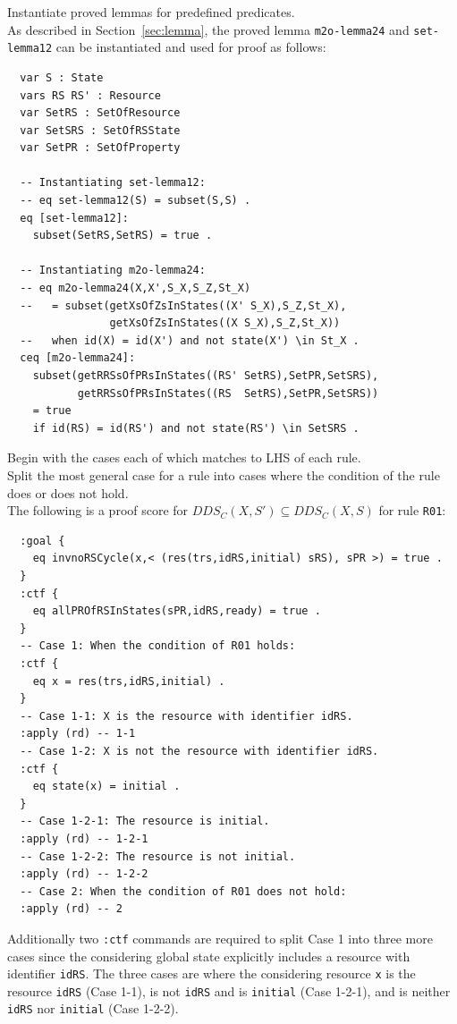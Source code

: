 \documentclass[12pt]{report}
\begin{document}
\vspace{0.3cm}
 Instantiate proved lemmas for predefined
predicates. \\ As described in Section~\ref{sec:lemma}, the proved
lemma {\tt m2o-lemma24} and {\tt set-lemma12} can be instantiated and
used for proof as follows:
\begin{verbatim}
  var S : State
  vars RS RS' : Resource
  var SetRS : SetOfResource
  var SetSRS : SetOfRSState
  var SetPR : SetOfProperty

  -- Instantiating set-lemma12:
  -- eq set-lemma12(S) = subset(S,S) .
  eq [set-lemma12]:
    subset(SetRS,SetRS) = true .

  -- Instantiating m2o-lemma24:
  -- eq m2o-lemma24(X,X',S_X,S_Z,St_X)
  --   = subset(getXsOfZsInStates((X' S_X),S_Z,St_X),
                getXsOfZsInStates((X S_X),S_Z,St_X))
  --   when id(X) = id(X') and not state(X') \in St_X .
  ceq [m2o-lemma24]:
    subset(getRRSsOfPRsInStates((RS' SetRS),SetPR,SetSRS),
           getRRSsOfPRsInStates((RS  SetRS),SetPR,SetSRS))
    = true
    if id(RS) = id(RS') and not state(RS') \in SetSRS .
\end{verbatim}

\vspace{0.3cm}
 Begin with the cases each of which matches to
LHS of each rule. \\ 
 Split the most general case for a rule into
cases where the condition of the rule does or does not hold. \\

\vspace{0.3cm}
The following is a proof score for $DDS_C(X,S')\subseteq DDS_C(X,S)$ for
rule {\tt R01}:
\begin{verbatim}
  :goal {
    eq invnoRSCycle(x,< (res(trs,idRS,initial) sRS), sPR >) = true .
  }
  :ctf {
    eq allPROfRSInStates(sPR,idRS,ready) = true .
  }
  -- Case 1: When the condition of R01 holds:
  :ctf {
    eq x = res(trs,idRS,initial) .
  }
  -- Case 1-1: X is the resource with identifier idRS.
  :apply (rd) -- 1-1
  -- Case 1-2: X is not the resource with identifier idRS.
  :ctf {
    eq state(x) = initial .
  }
  -- Case 1-2-1: The resource is initial.
  :apply (rd) -- 1-2-1
  -- Case 1-2-2: The resource is not initial.
  :apply (rd) -- 1-2-2
  -- Case 2: When the condition of R01 does not hold:
  :apply (rd) -- 2
\end{verbatim}
Additionally two {\tt :ctf} commands are required to split Case 1 into
three more cases since the considering global state explicitly
includes a resource with identifier {\tt idRS}. The three cases are
where the considering resource {\tt x} is the resource {\tt idRS}
(Case 1-1), is not {\tt idRS} and is {\tt initial} (Case 1-2-1), and
is neither {\tt idRS} nor {\tt initial} (Case 1-2-2).\\
\end{document}
